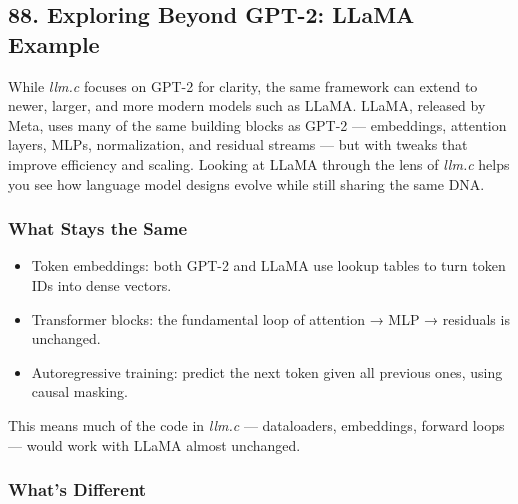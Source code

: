 \documentclass[
  letterpaper,
  DIV=11,
  numbers=noendperiod]{scrreprt}
\providecommand{\tightlist}{%
  \setlength{\itemsep}{0pt}\setlength{\parskip}{0pt}}
\begin{document}
\subsection{88. Exploring Beyond GPT-2: LLaMA
Example}\label{exploring-beyond-gpt-2-llama-example}

While \emph{llm.c} focuses on GPT-2 for clarity, the same framework can
extend to newer, larger, and more modern models such as LLaMA. LLaMA,
released by Meta, uses many of the same building blocks as GPT-2 ---
embeddings, attention layers, MLPs, normalization, and residual streams
--- but with tweaks that improve efficiency and scaling. Looking at
LLaMA through the lens of \emph{llm.c} helps you see how language model
designs evolve while still sharing the same DNA.

\subsubsection{What Stays the Same}\label{what-stays-the-same}

\begin{itemize}
\tightlist
\item
  Token embeddings: both GPT-2 and LLaMA use lookup tables to turn token
  IDs into dense vectors.
\item
  Transformer blocks: the fundamental loop of attention → MLP →
  residuals is unchanged.
\item
  Autoregressive training: predict the next token given all previous
  ones, using causal masking.
\end{itemize}

This means much of the code in \emph{llm.c} --- dataloaders, embeddings,
forward loops --- would work with LLaMA almost unchanged.

\subsubsection{What's Different}\label{whats-different}
\end{document}

